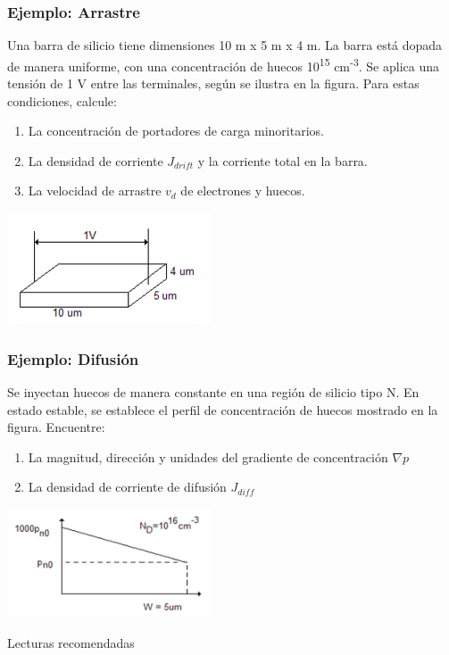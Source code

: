 \documentclass[10pt,t,aspectratio=169]{beamer}
\begin{document}
\begin{frame}[t]
    \frametitle{Ejemplo: Arrastre}

    Una barra de silicio tiene dimensiones 10 \textmu{}m x 5 \textmu{}m x 4 \textmu{}m.  La barra está dopada de manera uniforme, con una concentración de huecos 10\textsuperscript{15} cm\textsuperscript{-3}. Se aplica una tensión de 1 V entre las terminales, según se ilustra en la figura. Para estas condiciones, calcule:

    \begin{enumerate}
        \item La concentración de portadores de carga minoritarios.
        \item La densidad de corriente $J_{drift}$ y la corriente total en la barra.
        \item La velocidad de arrastre $v_d$ de electrones y huecos.
    \end{enumerate}

    \centering
    \includegraphics[width=6cm]{./figures/ejemplo-arrastre.png}
\end{frame}

\begin{frame}[t]
    \frametitle{Ejemplo: Difusión}

    Se inyectan huecos de manera constante en una región de silicio tipo N. En estado estable, se establece el perfil de concentración de huecos mostrado en la figura. Encuentre:

    \begin{enumerate}
        \item La magnitud, dirección y unidades del gradiente de concentración $\nabla{p}$
        \item La densidad de corriente de difusión $J_{diff}$
    \end{enumerate}

    \centering
    \includegraphics[width=6cm]{./figures/ejemplo-difusion.png}
\end{frame}


\begin{frame}{Lecturas recomendadas}
    
\end{frame}
\end{document}
